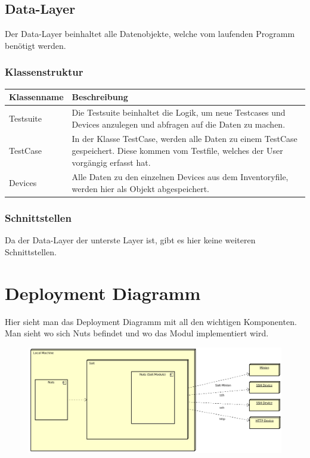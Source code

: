 \documentclass[a4,12pt]{scrartcl}
\begin{document}
\subsection{Data-Layer}
Der Data-Layer beinhaltet alle Datenobjekte, welche vom laufenden Programm benötigt werden.
\subsubsection{Klassenstruktur}
\begin{table}[H]
\centering
    \begin{tabular}{@{}l p{11cm} @{}}\toprule    
    {Klassenname} & {Beschreibung}\\ \midrule
    
    Testsuite & Die Testsuite beinhaltet die Logik, um neue Testcases und Devices anzulegen und abfragen auf die Daten zu machen.\\     
    TestCase & In der Klasse TestCase, werden alle Daten zu einem TestCase gespeichert. Diese kommen vom Testfile, welches der User vorgängig erfasst hat.\\         
    Devices & Alle Daten zu den einzelnen Devices aus dem Inventoryfile, werden hier als Objekt abgespeichert.\\
  
    \bottomrule
    \end{tabular}
\end{table}
\subsubsection{Schnittstellen}
Da der Data-Layer der unterste Layer ist, gibt es hier keine weiteren Schnittstellen.
\newpage
\section{Deployment Diagramm}
Hier sieht man das Deployment Diagramm mit all den wichtigen Komponenten. Man sieht wo sich Nuts befindet und wo das Modul implementiert wird.
\begin{figure} [H]
	\begin{center}
	\includegraphics[width=1\textwidth]{./pictures/DeploymentDiagram.png}
	\label{Bild Referenz}
	\end{center}
\end{figure}
\newpage
\end{document}
